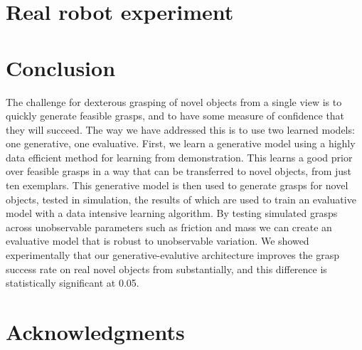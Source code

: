 \documentclass[conference]{IEEEtran}
\begin{document}
\section{Real robot experiment}
\label{section:experiments}


\section{Conclusion} 
\label{sec:conclusion}

The challenge for dexterous grasping of novel objects from a single view is to quickly generate feasible grasps, and to have some measure of confidence that they will succeed. The way we have addressed this is to use two learned models: one generative, one evaluative. First, we learn a generative model using a highly data efficient method for learning from demonstration. This learns a good prior over feasible grasps in a way that can be transferred to novel objects, from just ten exemplars. This generative model is then used to generate grasps for novel objects, tested in simulation, the results of which are used to train an evaluative model with a data intensive learning algorithm. By testing simulated grasps across unobservable parameters such as friction and mass we can create an evaluative model that is robust to unobservable variation. We showed experimentally that our generative-evalutive architecture  improves the grasp success rate on real novel objects from substantially, and this difference is statistically significant at 0.05. 

\section*{Acknowledgments}

\end{document}

